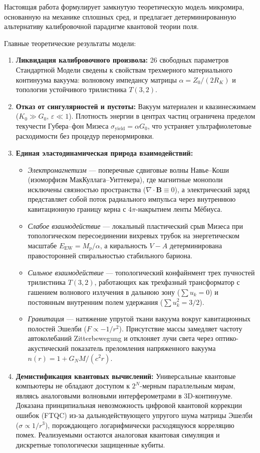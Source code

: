 \documentclass[11pt,a4paper]{article}
\theoremstyle{definition}
\theoremstyle{remark}
\begin{document}
Настоящая работа формулирует замкнутую теоретическую модель микромира, основанную на механике сплошных сред, и предлагает детерминированную альтернативу калибровочной парадигме квантовой теории поля.

Главные теоретические результаты модели:
\begin{enumerate}
\item \textbf{Ликвидация калибровочного произвола:} 26 свободных параметров Стандартной Модели сведены к свойствам трехмерного материального континуума вакуума: волновому импедансу матрицы $\alpha = Z_0 / (2 R_K)$ и топологии устойчивого трилистника $T(3,2)$.
\item \textbf{Отказ от сингулярностей и пустоты:} Вакуум материален и квазинесжимаем ($K_0 \gg G_0$, $\varepsilon \ll 1$). Плотность энергии в центрах частиц ограничена пределом текучести Губера--фон Мизеса $\sigma_{\mathrm{yield}} = \alpha G_0$, что устраняет ультрафиолетовые расходимости без процедур перенормировки.
\item \textbf{Единая эластодинамическая природа взаимодействий:}
\begin{itemize}
\item \textit{Электромагнетизм} — поперечные сдвиговые волны Навье--Коши (изоморфизм МакКуллага--Уиттекера), где магнитные монополи исключены связностью пространства ($\nabla \cdot \mathbf{B} \equiv 0$), а электрический заряд представляет собой поток радиального импульса через внутреннюю кавитационную границу керна с $4\pi$-накрытием ленты Мёбиуса.
\item \textit{Слабое взаимодействие} — локальный пластический срыв Мизеса при топологическом пересоединении вихревых трубок на энергетическом масштабе $E_{\mathrm{EW}} = M_p / \alpha$, а киральность $V-A$ детерминирована правосторонней спиральностью стабильного бариона.
\item \textit{Сильное взаимодействие} — топологический конфайнмент трех пучностей трилистника $T(3,2)$, работающих как трехфазный трансформатор с гашением волнового излучения в дальнюю зону ($\sum u_k = 0$) и постоянным внутренним полем удержания ($\sum u_k^2 = 3/2$).
\item \textit{Гравитация} — натяжение упругой ткани вакуума вокруг кавитационных полостей Эшелби ($F \propto -1/r^2$). Присутствие массы замедляет частоту автоколебаний Zitterbewegung и отклоняет лучи света через оптико-акустический показатель преломления напряженного вакуума $n(r) = 1 + G_N M / (c^2 r)$.
\end{itemize}
\item \textbf{Демистификация квантовых вычислений:} Универсальные квантовые компьютеры не обладают доступом к $2^N$-мерным параллельным мирам, являясь аналоговыми волновыми интерферометрами в 3D-континууме. Доказана принципиальная невозможность цифровой квантовой коррекции ошибок (FTQC) из-за дальнодействующего упругого шума матрицы Эшелби ($\sigma \propto 1/r^3$), порождающего логарифмически расходящуюся корреляцию помех. Реализуемыми остаются аналоговая квантовая симуляция и дискретные топологически защищенные кубиты.

\end{enumerate}
\end{document}
